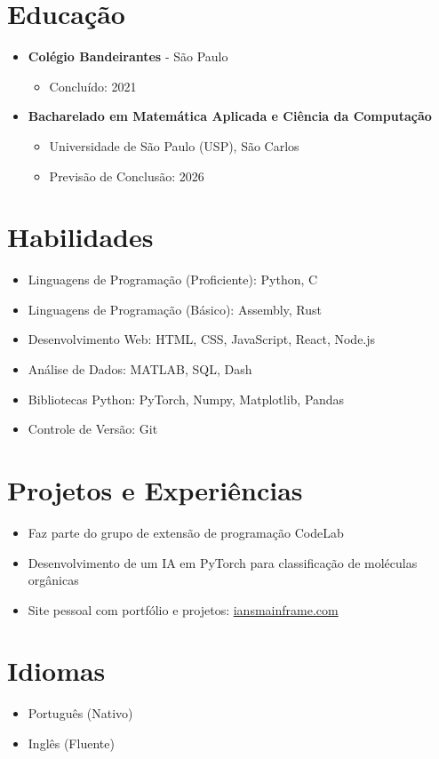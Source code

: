 \documentclass[a4paper,11pt]{article}
\begin{document}
\section*{Educação}
\vspace{-0.3em}
\begin{itemize}[leftmargin=*, itemsep=-2pt]
  \item \textbf{Colégio Bandeirantes} - São Paulo
    \begin{itemize}[itemsep=-1pt]
      \item Concluído: 2021
    \end{itemize}
  \item \textbf{Bacharelado em Matemática Aplicada e Ciência da Computação}
    \begin{itemize}[itemsep=-1pt]
      \item Universidade de São Paulo (USP), São Carlos
      \item Previsão de Conclusão: 2026
    \end{itemize}
\end{itemize}
\vspace{-0.3em}

\section*{Habilidades}
\vspace{-0.3em}
\begin{itemize}[leftmargin=*, itemsep=-2pt]
  \item Linguagens de Programação (Proficiente): Python, C
  \item Linguagens de Programação (Básico): Assembly, Rust
  \item Desenvolvimento Web: HTML, CSS, JavaScript, React, Node.js
  \item Análise de Dados: MATLAB, SQL, Dash
  \item Bibliotecas Python: PyTorch, Numpy, Matplotlib, Pandas
  \item Controle de Versão: Git
\end{itemize}
\vspace{-0.3em}

\section*{Projetos e Experiências}
\vspace{-0.3em}
\begin{itemize}[leftmargin=*, itemsep=-2pt]
  \item Faz parte do grupo de extensão de programação CodeLab
  \item Desenvolvimento de um IA em PyTorch para classificação de moléculas orgânicas
  \item Site pessoal com portfólio e projetos: \href{https://iansmainframe.com}{iansmainframe.com}
\end{itemize}
\vspace{-0.3em}

\section*{Idiomas}
\vspace{-0.3em}
\begin{itemize}[leftmargin=*, itemsep=-2pt]
  \item Português (Nativo)
  \item Inglês (Fluente)
\end{itemize}
\end{document}
